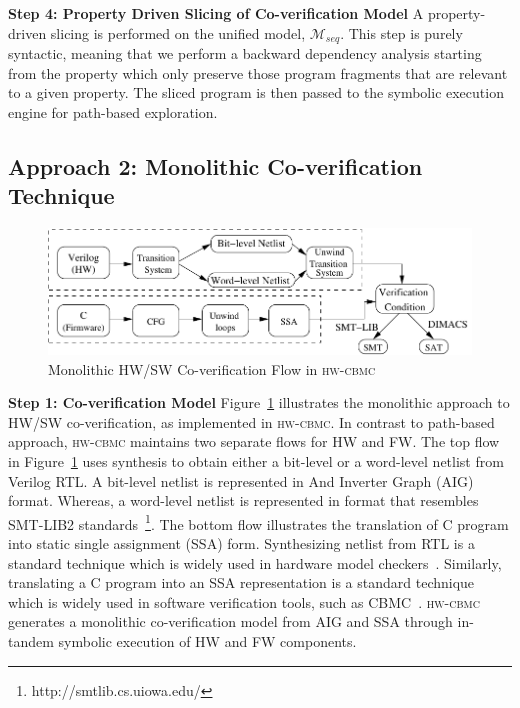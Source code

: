 \documentclass[sigconf]{acmart}
\newcommand{\tool}[1]{\textsc{#1}\xspace}
\newcommand{\hwcbmcv}{\tool{hw-cbmc}}
\newcommand{\verifox}{\tool{CoVerIf}}
\begin{document}
\textbf{Step 4: Property Driven Slicing of Co-verification Model}
A property-driven slicing is performed on the unified model, $\mathcal{M}_{seq}$.  
This step is purely syntactic, meaning that we perform a backward dependency 
analysis starting from the property which only preserve those 
program fragments that are relevant to a given property. The sliced program 
is then passed to the symbolic execution engine for path-based exploration. \\
%

%
\subsection{Approach 2: Monolithic Co-verification Technique}
%
\begin{figure}[t]
\begin{center}
\includegraphics[scale=0.6]{figures/traditional_flow.pdf}
\caption{\small Monolithic HW/SW Co-verification Flow in \hwcbmcv}
\label{fig:conventional}
\end{center}
\end{figure}
%
\textbf{Step 1: Co-verification Model}
%
Figure~\ref{fig:conventional} illustrates the monolithic approach to HW/SW
co-veri\-fi\-cation, as implemented in \hwcbmcv.  
In contrast to path-based approach,
\hwcbmcv maintains two separate flows for HW and FW.  The top flow in
Figure~\ref{fig:conventional} uses synthesis to obtain either a bit-level or
a word-level netlist from Verilog RTL.  A bit-level netlist is represented 
in And Inverter Graph (AIG) format.  Whereas, a word-level netlist is represented 
in format that resembles SMT-LIB2 standards~\footnote{http://smtlib.cs.uiowa.edu/}.  
The bottom flow illustrates the translation of C program 
into static single assignment (SSA) form. 
Synthesizing netlist from RTL is a standard technique which is widely 
used in hardware model checkers~\cite{DBLP:journals/tse/Clarke76}.
Similarly, translating a C program into an SSA representation is a 
standard technique which is widely used in 
software verification tools, such as CBMC~\cite{cbmc.tacas:2004}. 
\hwcbmcv generates a monolithic co-verification model from AIG and SSA through 
in-tandem symbolic execution of HW and FW components.  
\end{document}
